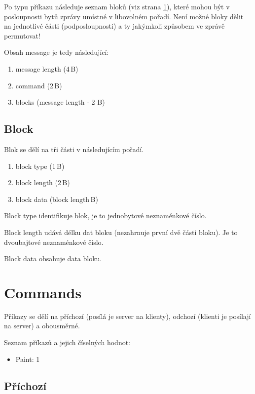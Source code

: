 \documentclass[12pt,oneside,a4paper]{report}
\begin{document}
Po typu příkazu následuje seznam bloků (viz strana \ref{text.collab_message.block}), které mohou být v posloupnosti bytů zprávy umístné v libovolném pořadí. Není možné bloky dělit na jednotlivé části (podposloupnosti) a ty jakýmkoli způsobem ve zprávě permutovat!

Obsah message je tedy následující:

\begin{enumerate}
	\item message length (4\,{}B)
	\item command (2\,{}B)
	\item blocks (message length - 2 B)
\end{enumerate}

\section{Block}
\label{text.collab_message.block}

Blok se dělí na tři části v následujícím pořadí.

\begin{enumerate}
	\item block type (1\,{}B)
	\item block length (2\,{}B)
	\item block data (block length\,{}B)
\end{enumerate}

Block type identifikuje blok, je to jednobytové neznaménkové číslo.

Block length udává délku dat bloku (nezahrnuje první dvě části bloku). Je to dvoubajtové neznaménkové číslo.

Block data obsahuje data bloku.

\chapter{Commands}

Příkazy se dělí na příchozí (posílá je server na klienty), odchozí (klienti je posílají na server) a obousměrné.

Seznam příkazů a jejich číselných hodnot:

\begin{itemize}
	\item Paint: 1
\end{itemize}

\section{Příchozí}
\end{document}
